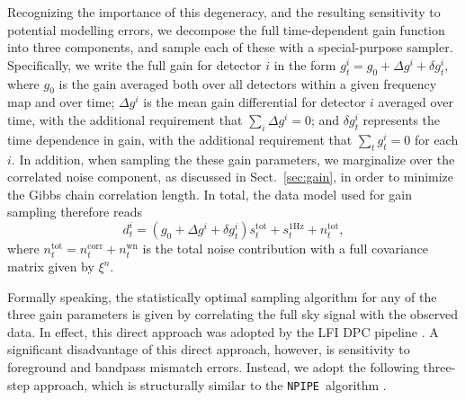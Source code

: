 \documentclass[twocolumn]{aa}
\newcommand{\npipe}[0]{\texttt{NPIPE}}
\begin{document}
Recognizing the importance of this degeneracy, and the resulting
sensitivity to potential modelling errors, we decompose the full
time-dependent gain function into three components, and sample each of
these with a special-purpose sampler. Specifically, we write the full
gain for detector $i$ in the form ${g^i_t = g_0 + \Delta g^i + \delta
  g^i_t}$, where $g_0$ is the gain averaged both over all detectors
within a given frequency map and over time; $\Delta g^i$ is the mean
gain differential for detector $i$ averaged over time, with the
additional requirement that $\sum_i \Delta g^i = 0$; and $\delta
g^i_t$ represents the time dependence in gain, with the additional
requirement that $\sum_t g^i_t = 0$ for each $i$. In addition, when
sampling the these gain parameters, we marginalize over the correlated
noise component, as discussed in Sect.~\ref{sec:gain}, in order to
minimize the Gibbs chain correlation length. In total, the data model
used for gain sampling therefore reads
\begin{equation}
  d^i_{t} = (g_0 + \Delta g^i + \delta g_t^i) s^{\mathrm{tot}}_{t} + s^{\mathrm{1Hz}}_t + n^{\mathrm{tot}}_{t},
  \label{eq:gainmodel2}
\end{equation}
where $n^{\mathrm{tot}}_{t} = n^{\mathrm{corr}}_{t} +
n^{\mathrm{wn}}_{t}$ is the total noise contribution with a full
covariance matrix given by $\xi^n$.

Formally speaking, the statistically optimal sampling algorithm for
any of the three gain parameters is given by correlating the full sky
signal with the observed data. In effect, this direct approach was
adopted by the LFI DPC pipeline \citep{planck2016-l02}. A significant
disadvantage of this direct approach, however, is sensitivity to
foreground and bandpass mismatch errors. Instead, we adopt the
following three-step approach, which is structurally similar to the
\npipe\ algorithm \citep{planck2020-LVII}.
\end{document}
